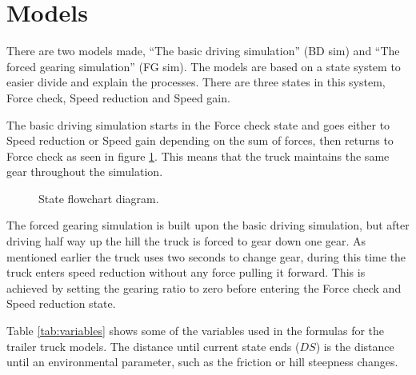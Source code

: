 \documentclass[noprint]{uit-thesis}
\begin{document}
\section{Models}
\label{models}
There are two models made, “The basic driving simulation” (BD sim) and “The forced gearing simulation” (FG sim). The models are based on a state system to easier divide and explain the processes. There are three states in this system, Force check, Speed reduction and Speed gain. 
\par
The basic driving simulation starts in the Force check state and goes either to Speed reduction or Speed gain depending on the sum of forces, then returns to Force check as seen in figure \ref{fig:StateDiagram}. This means that the truck maintains the same gear throughout the simulation. 

\begin{figure} [H]
\centering

\caption{State flowchart diagram.}
\label{fig:StateDiagram}
\end{figure}

The forced gearing simulation is built upon the basic driving simulation, but after driving half way up the hill the truck is forced to gear down one gear. As mentioned earlier the truck uses two seconds to change gear, during this time the truck enters speed reduction without any force pulling it forward. This is achieved by setting the gearing ratio to zero before entering the Force check and Speed reduction state.


Table \ref{tab:variables} shows some of the variables used in the formulas for the trailer truck models. The distance until current state ends ($DS$) is the distance until an environmental parameter, such as the friction or hill steepness changes. 
\end{document}
